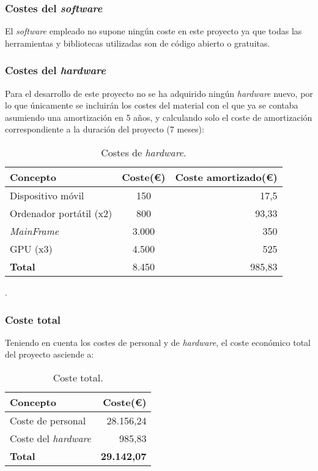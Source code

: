 \subsubsection{Costes del \textit{software}}

El \textit{software} empleado no supone ningún coste en este proyecto ya que todas las herramientas y bibliotecas utilizadas son de código abierto o gratuitas. 

\subsubsection{Costes del \textit{hardware}}

Para el desarrollo de este proyecto no se ha adquirido ningún \textit{hardware} nuevo, por lo que únicamente se incluirán los costes del material con el que ya se contaba asumiendo una amortización en 5 años, y calculando solo el coste de amortización correspondiente a la duración del proyecto (7 meses): 

\begin{table}[H]
	\centering
	\begin{tabular}[]{@{}l c r@{}}
		\toprule
		\textbf{Concepto} & \textbf{Coste(\euro{})} & \textbf{Coste amortizado(\euro{})} \\
		\midrule
		Dispositivo móvil & 150 & 17,5 \\
		Ordenador portátil (x2) & 800 & 93,33 \\
		\textit{MainFrame} & 3.000 & 350 \\ 
		GPU (x3) & 4.500 & 525 \\\hubu
		\textbf{Total} & 8.450 & 985,83 \\
		\bottomrule
	\end{tabular}
	\caption{Costes de \textit{hardware}.}
	\label{tab:costes_hardware}.
\end{table}

\subsubsection{Coste total}

Teniendo en cuenta los costes de personal y de \textit{hardware}, el coste económico total del proyecto asciende a:

\begin{table}[H]
	\centering
	\begin{tabular}[]{@{}l r@{}}
		\toprule
		\textbf{Concepto} & \textbf{Coste(\euro{})} \\
		\midrule
		Coste de personal & 28.156,24 \\ 
		Coste del \textit{hardware} & 985,83 \\\hubu
		\textbf{Total} & \textbf{29.142,07} \\	
		\bottomrule	
	\end{tabular}
	\caption{Coste total.}
	\label{tab:coste_total}
\end{table}


